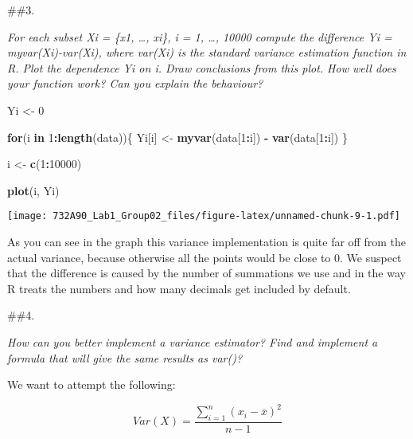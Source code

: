 \documentclass[]{article}
\newenvironment{Shaded}{\begin{snugshade}}{\end{snugshade}}
\newcommand{\ControlFlowTok}[1]{\textcolor[rgb]{0.13,0.29,0.53}{\textbf{#1}}}
\newcommand{\DecValTok}[1]{\textcolor[rgb]{0.00,0.00,0.81}{#1}}
\newcommand{\KeywordTok}[1]{\textcolor[rgb]{0.13,0.29,0.53}{\textbf{#1}}}
\newcommand{\NormalTok}[1]{#1}
\newcommand{\OperatorTok}[1]{\textcolor[rgb]{0.81,0.36,0.00}{\textbf{#1}}}
\newcommand{\StringTok}[1]{\textcolor[rgb]{0.31,0.60,0.02}{#1}}
\begin{document}
\#\#3.

\emph{For each subset Xi = \{x1, \ldots{}, xi\}, i = 1, \ldots{}, 10000
compute the difference Yi = myvar(Xi)-var(Xi), where var(Xi) is the
standard variance estimation function in R. Plot the dependence Yi on i.
Draw conclusions from this plot. How well does your function work? Can
you explain the behaviour?}

\begin{Shaded}
\begin{Highlighting}[]
\NormalTok{Yi <-}\StringTok{ }\DecValTok{0}

\ControlFlowTok{for}\NormalTok{(i }\ControlFlowTok{in} \DecValTok{1}\OperatorTok{:}\KeywordTok{length}\NormalTok{(data))\{}
\NormalTok{  Yi[i] <-}\StringTok{ }\KeywordTok{myvar}\NormalTok{(data[}\DecValTok{1}\OperatorTok{:}\NormalTok{i]) }\OperatorTok{-}\StringTok{ }\KeywordTok{var}\NormalTok{(data[}\DecValTok{1}\OperatorTok{:}\NormalTok{i])}
\NormalTok{\}}

\NormalTok{i <-}\StringTok{ }\KeywordTok{c}\NormalTok{(}\DecValTok{1}\OperatorTok{:}\DecValTok{10000}\NormalTok{)}
  
\KeywordTok{plot}\NormalTok{(i, Yi)}
\end{Highlighting}
\end{Shaded}

\texttt{[image: 732A90\_Lab1\_Group02\_files/figure-latex/unnamed-chunk-9-1.pdf]}

As you can see in the graph this variance implementation is quite far
off from the actual variance, because otherwise all the points would be
close to 0. We suspect that the difference is caused by the number of
summations we use and in the way R treats the numbers and how many
decimals get included by default.

\#\#4.

\emph{How can you better implement a variance estimator? Find and
implement a formula that will give the same results as var()?}

We want to attempt the following:

\[Var(X) = \frac{\sum_{i=1}^{n}(x_i - \overline{x})^2}{n-1}\]
\end{document}
